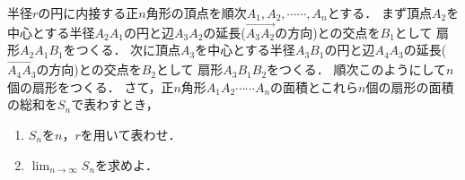 \documentclass[../../main.tex]{subfiles}
\begin{document}
半径$r$の円に内接する正$n$角形の頂点を順次$A_1,A_2,\cdots\cdots,A_n$とする．
まず頂点$A_2$を中心とする半径$A_2A_1$の円と辺$A_3A_2$の延長($\overrightarrow{A_3A_2}$の方向)との交点を$B_1$として
扇形$A_2A_1B_1$をつくる．
次に頂点$A_3$を中心とする半径$A_3B_1$の円と辺$A_4A_3$の延長($\overrightarrow{A_4A_3}$の方向)との交点を$B_2$として
扇形$A_3B_1B_2$をつくる．
順次このようにして$n$個の扇形をつくる．
さて，正$n$角形$A_1A_2\cdots\cdots A_n$の面積とこれら$n$個の扇形の面積の総和を$S_n$で表わすとき，
\begin{enumerate}
  \item $S_n$を$n$，$r$を用いて表わせ．
  \item $\displaystyle\lim_{n\to\infty}S_n$を求めよ．
\end{enumerate}
\end{document}
